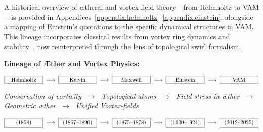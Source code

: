 A historical overview of ætheral and vortex field theory—from Helmholtz to VAM—is provided in Appendices~\ref{appendix:helmholtz}–\ref{appendix:einstein}, alongside a mapping of Einstein’s quotations to the specific dynamical structures in VAM. This lineage incorporates classical results from vortex ring dynamics and stability~\cite{morris1977vortex}, now reinterpreted through the lens of topological swirl formalism.


\vspace{1em}
\noindent\textbf{Lineage of Æther and Vortex Physics:}

\[\fbox{\makebox[2.2cm][c]{Helmholtz}} \;\longrightarrow\;\fbox{\makebox[2.2cm][c]{Kelvin}} \;\longrightarrow\;\fbox{\makebox[2.2cm][c]{Maxwell}} \;\longrightarrow\;\fbox{\makebox[2.2cm][c]{Einstein}} \;\longrightarrow\;\fbox{\makebox[2.2cm][c]{VAM}}\]

\begin{center}
\scriptsize
\textit{
Conservation of vorticity $\;\rightarrow\;$ Topological atoms $\;\rightarrow\;$ Field stress in æther $\;\rightarrow\;$ Geometric æther $\;\rightarrow\;$ Unified Vortex-fields
}
\end{center}
\[\fbox{\makebox[2.2cm][c]{(1858)}} \;\longrightarrow\;\fbox{\makebox[2.2cm][c]{(1867--1890)}} \;\longrightarrow\;\fbox{\makebox[2.2cm][c]{(1875--1878)}} \;\longrightarrow\;\fbox{\makebox[2.2cm][c]{(1920--1924)}} \;\longrightarrow\;\fbox{\makebox[2.2cm][c]{(2012--2025)}}\]

\vspace{1em}